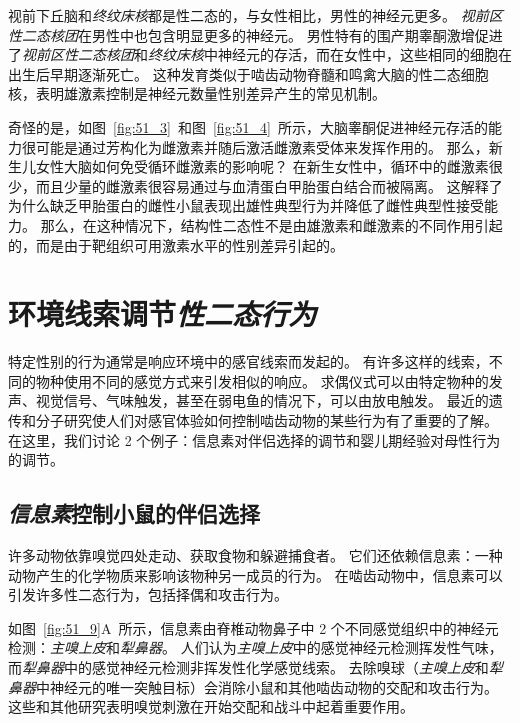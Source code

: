 视前下丘脑和\textit{终纹床核}都是性二态的，与女性相比，男性的神经元更多。
\textit{视前区性二态核团}在男性中也包含明显更多的神经元。
男性特有的围产期睾酮激增促进了\textit{视前区性二态核团}和\textit{终纹床核}中神经元的存活，而在女性中，这些相同的细胞在出生后早期逐渐死亡。
这种发育类似于啮齿动物脊髓和鸣禽大脑的性二态细胞核，表明雄激素控制是神经元数量性别差异产生的常见机制。


奇怪的是，如图~\ref{fig:51_3}~和图~\ref{fig:51_4}~所示，大脑睾酮促进神经元存活的能力很可能是通过芳构化为雌激素并随后激活雌激素受体来发挥作用的。
那么，新生儿女性大脑如何免受循环雌激素的影响呢？
在新生女性中，循环中的雌激素很少，而且少量的雌激素很容易通过与血清蛋白甲胎蛋白结合而被隔离。
这解释了为什么缺乏甲胎蛋白的雌性小鼠表现出雄性典型行为并降低了雌性典型性接受能力。
那么，在这种情况下，结构性二态性不是由雄激素和雌激素的不同作用引起的，而是由于靶组织可用激素水平的性别差异引起的。



\section{环境线索调节\textit{性二态行为}}

特定性别的行为通常是响应环境中的感官线索而发起的。
有许多这样的线索，不同的物种使用不同的感觉方式来引发相似的响应。
求偶仪式可以由特定物种的发声、视觉信号、气味触发，甚至在弱电鱼的情况下，可以由放电触发。
最近的遗传和分子研究使人们对感官体验如何控制啮齿动物的某些行为有了重要的了解。
在这里，我们讨论 2 个例子：信息素对伴侣选择的调节和婴儿期经验对母性行为的调节。



\subsection{\textit{信息素}控制小鼠的伴侣选择}
许多动物依靠嗅觉四处走动、获取食物和躲避捕食者。
它们还依赖信息素：一种动物产生的化学物质来影响该物种另一成员的行为。
在啮齿动物中，信息素可以引发许多性二态行为，包括择偶和攻击行为。


如图~\ref{fig:51_9}A~所示，信息素由脊椎动物鼻子中 2 个不同感觉组织中的神经元检测：\textit{主嗅上皮}和\textit{犁鼻器}。
人们认为\textit{主嗅上皮}中的感觉神经元检测挥发性气味，而\textit{犁鼻器}中的感觉神经元检测非挥发性化学感觉线索。
去除嗅球（\textit{主嗅上皮}和\textit{犁鼻器}中神经元的唯一突触目标）会消除小鼠和其他啮齿动物的交配和攻击行为。
这些和其他研究表明嗅觉刺激在开始交配和战斗中起着重要作用。


